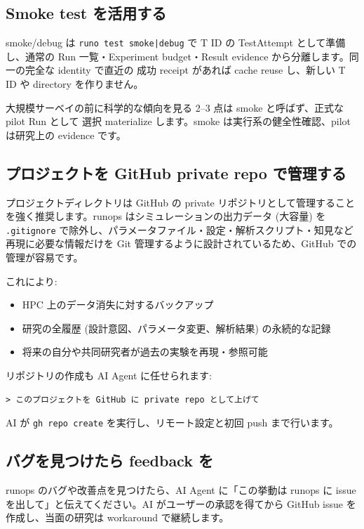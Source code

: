\documentclass[a4paper,11pt]{article}
\begin{document}
\subsection*{\color{accent} Smoke test を活用する}

smoke/debug は \texttt{runo test smoke|debug} で T ID の TestAttempt として準備し、通常の
Run 一覧・Experiment budget・Result evidence から分離します。同一の完全な identity で直近の
成功 receipt があれば cache reuse し、新しい T ID や directory を作りません。

大規模サーベイの前に科学的な傾向を見る 2--3 点は smoke と呼ばず、正式な pilot Run として
選択 materialize します。smoke は実行系の健全性確認、pilot は研究上の evidence です。

\subsection*{\color{accent} プロジェクトを GitHub private repo で管理する}

プロジェクトディレクトリは GitHub の private リポジトリとして管理することを強く推奨します。runops はシミュレーションの出力データ (大容量) を \texttt{.gitignore} で除外し、パラメータファイル・設定・解析スクリプト・知見など再現に必要な情報だけを Git 管理するように設計されているため、GitHub での管理が容易です。

これにより:
\begin{itemize}[nosep]
  \item HPC 上のデータ消失に対するバックアップ
  \item 研究の全履歴 (設計意図、パラメータ変更、解析結果) の永続的な記録
  \item 将来の自分や共同研究者が過去の実験を再現・参照可能
\end{itemize}

リポジトリの作成も AI Agent に任せられます:

\begin{lstlisting}[language={},commentstyle={}]
> このプロジェクトを GitHub に private repo として上げて
\end{lstlisting}

AI が \texttt{gh repo create} を実行し、リモート設定と初回 push まで行います。

\subsection*{\color{accent} バグを見つけたら feedback を}

runops のバグや改善点を見つけたら、AI Agent に「この挙動は runops に issue を出して」と伝えてください。AI がユーザーの承認を得てから GitHub issue を作成し、当面の研究は workaround で継続します。
\end{document}

